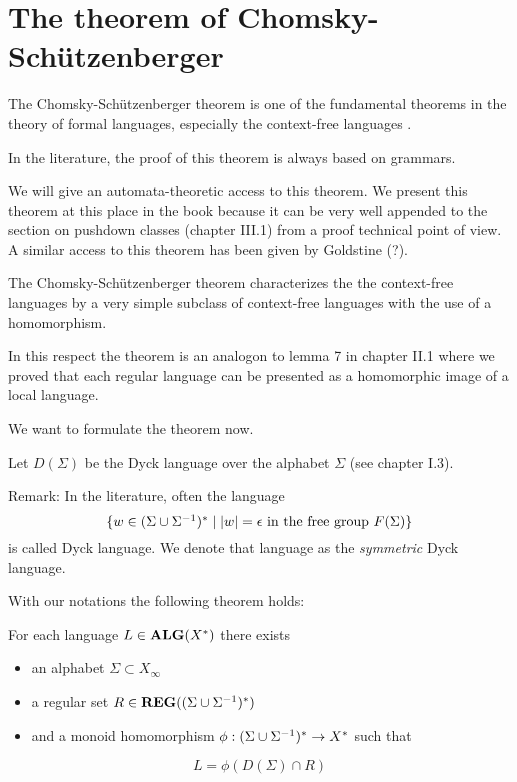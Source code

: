 \section{The theorem of Chomsky-Schützenberger}

The Chomsky-Schützenberger theorem is one of the fundamental theorems in the
theory of formal languages, especially the context-free languages \cite{ChSch}.

In the literature, the proof of this theorem is always based on grammars.

We will give an automata-theoretic access to this theorem. We present this
theorem at this place in the book because it can be very well appended to the
section on pushdown classes (chapter III.1) from a proof technical point of
view. A similar access to this theorem has been given by Goldstine
\cite{Goldstine77} (?).

The Chomsky-Schützenberger theorem characterizes the the context-free languages
by a very simple subclass of context-free languages with the use of a
homomorphism.

In this respect the theorem is an analogon to lemma 7 in chapter II.1 where we
proved that each regular language can be presented as a homomorphic image of a
local language.

We want to formulate the theorem now.

Let $D(\Sigma)$ be the Dyck language over the alphabet $\Sigma$ (see chapter
I.3).

Remark: In the literature, often the language \[ \mbox{$\{w\in
(\Sigma \cup {\Sigma}^{-1})^* \mid |w|= \epsilon\text{ in the free group }F(\Sigma)\}$} \]
is called Dyck language. We denote that language as the {\em symmetric} Dyck
language.

With our notations the following theorem holds:
\begin{theorem} For each language $L\in \mbox{{\bf ALG}}(X^*)$
there exists
\begin{itemize}
  \item an alphabet $\Sigma \subset X_\infty$
  \item a regular set $R\in \mbox{{\bf REG}}((\Sigma \cup {\Sigma}^{-1})^*)$
  \item and a monoid homomorphism $\phi: (\Sigma \cup {\Sigma}^{-1})^* \to X^*$ such
  that
\end{itemize}
\[ L = \phi(D(\Sigma)\cap R) \]
\end{theorem}


